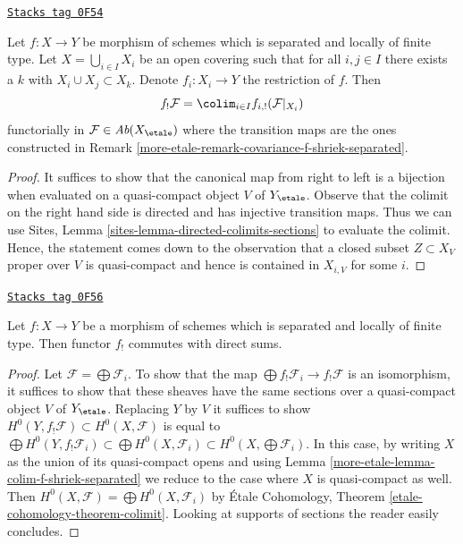 \begin{lemma}
\label{more-etale-lemma-colim-f-shriek-separated}
\href{https://stacks.math.columbia.edu/tag/0F54}{\texttt{Stacks tag 0F54}}

Let $f : X \to Y$ be morphism of schemes which is separated and
locally of finite type. Let $X = \bigcup_{i \in I} X_i$ be an
open covering such that for all $i, j \in I$ there exists a $k$
with $X_i \cup X_j \subset X_k$. Denote $f_i : X_i \to Y$
the restriction of $f$. Then
$$
f_!\mathcal{F} = \colim_{i \in I} f_{i, !}(\mathcal{F}|_{X_i})
$$
functorially in $\mathcal{F} \in \textit{Ab}(X_\etale)$
where the transition maps are the ones constructed in
Remark \ref{more-etale-remark-covariance-f-shriek-separated}.
\end{lemma}

\begin{proof}
It suffices to show that the canonical map from
right to left is a bijection when evaluated on a quasi-compact
object $V$ of $Y_\etale$.
Observe that the colimit on the right hand side is directed
and has injective transition maps.
Thus we can use
Sites, Lemma \ref{sites-lemma-directed-colimits-sections}
to evaluate the colimit. Hence, the statement comes down
to the observation that a closed subset $Z \subset X_V$ proper over $V$
is quasi-compact and hence is contained in $X_{i, V}$ for some $i$.
\end{proof}

\begin{lemma}
\label{more-etale-lemma-f-shriek-separated-direct-sums}
\href{https://stacks.math.columbia.edu/tag/0F56}{\texttt{Stacks tag 0F56}}

Let $f : X \to Y$ be a morphism of schemes which is separated and
locally of finite type. Then functor $f_!$ commutes with direct sums.
\end{lemma}

\begin{proof}
Let $\mathcal{F} = \bigoplus \mathcal{F}_i$. To show that the map
$\bigoplus f_!\mathcal{F}_i \to f_!\mathcal{F}$ is an isomorphism,
it suffices to show that these sheaves have the same sections over
a quasi-compact object $V$ of $Y_\etale$. Replacing $Y$ by $V$
it suffices to show
$H^0(Y, f_!\mathcal{F}) \subset H^0(X, \mathcal{F})$
is equal to
$\bigoplus H^0(Y, f_!\mathcal{F}_i)
\subset \bigoplus H^0(X, \mathcal{F}_i)
\subset H^0(X, \bigoplus \mathcal{F}_i)$.
In this case, by writing $X$ as the union of its quasi-compact opens
and using Lemma \ref{more-etale-lemma-colim-f-shriek-separated}
we reduce to the case where $X$ is quasi-compact as well.
Then $H^0(X, \mathcal{F}) = \bigoplus H^0(X, \mathcal{F}_i)$
by \'Etale Cohomology, Theorem \ref{etale-cohomology-theorem-colimit}.
Looking at supports of sections the reader easily concludes.
\end{proof}

